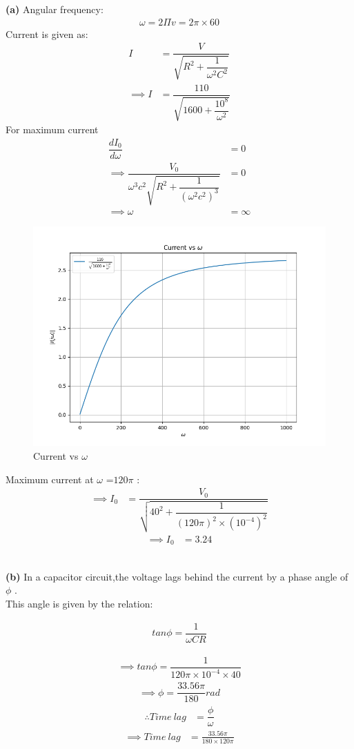 \documentclass[journal,12pt,twocolumn]{IEEEtran}
\theoremstyle{remark}
\begin{document}
\textbf{(a)} 
Angular frequency:
\begin{align}
\label{eq:tri-pts/5} \omega =2\Pi v =2\pi \times 60
\end{align}
Current is given as: 
\begin{align}
	\label{eq:tri-pts/9} I &=\dfrac{V}{\sqrt{R^2 + \dfrac{1}{\omega^2C^2}}}\\
	\label{eq:tri-pts/1} \implies I &=\dfrac{110}{\sqrt{1600 + \dfrac{10^8}	{\omega^2}}}
\end{align}
For maximum current 
\begin{align}
	\label{eq:tri-pts/27} \dfrac{dI_0}{d\omega}&=0\\
	\implies \dfrac{V_0}{ \omega^3 c^2 \sqrt{R^2 + \dfrac{1}{(\omega^2c^2)^3}}}&=0\\
\implies \omega&=\infty
\end{align}
\begin{figure}[h]
    \centering
    \includegraphics[width = 2.4 in, height = 1.6 in]{figs/fig4.png}
    \caption{Current vs $\omega$}
    \label{fig:h_plot}
\end{figure}

Maximum current at $\omega$ =$120\pi$ :
\begin{align}
	\label{eq:tri-pts/10}\implies I_0 &=\dfrac{V_0}{\sqrt{40^2 + \dfrac{1}{{(120\pi)^2 \times (10^{-4})^2}}}}
\end{align}
\begin{align}
	\label{eq:tri-pts/11}\implies I_0 &=3.24
\end{align}
\\
\begin{flushleft}\textbf{(b)} In a capacitor circuit,the voltage lags behind the current by a phase angle of $\phi$ .\\
This angle is given by the relation:\\
\end{flushleft}
\begin{align}
	\label{eq:tri-pts/12} tan\phi=\dfrac{1}{\omega CR}
\end{align}

\begin{align}
	\label{eq:tri-pts/13}\implies tan\phi=\dfrac{1}{120\pi \times 10^{-4} \times 40}
\end{align}
\begin{align}
	\label{eq:tri-pts/14}\implies \phi =\dfrac{33.56\pi}{180}rad
\end{align}
\begin{align}
	\label{eq:tri-pts/15} \therefore Time\: lag   &=\dfrac{\phi}{\omega}
\end{align}
\begin{align}
	\label{eq:tri-pts/16}\implies Time\: lag &= \frac{33.56\pi}{180 \times 120\pi}
\end{align}
\end{document}
